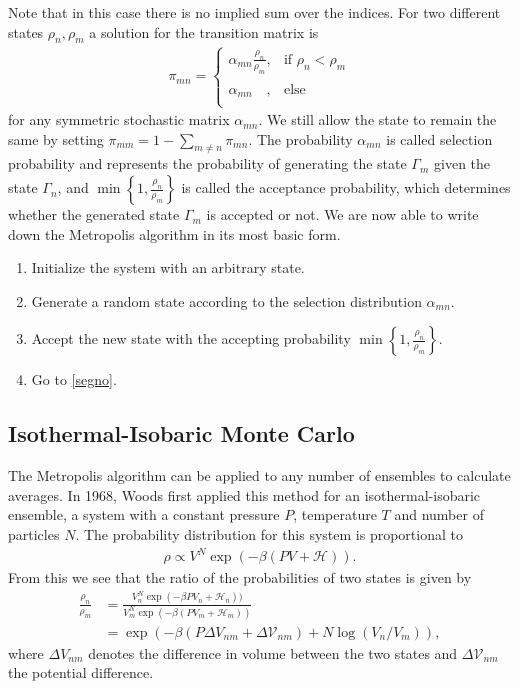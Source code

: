 Note that in this case there is no implied sum over the indices. For two different states $\rho_n,\rho_m$ a solution for the transition matrix is
\begin{align}
    \pi_{mn} =
    \begin{cases}
    \alpha_{mn} \frac{\rho_n}{\rho_m} , & \text{if } \rho_n<\rho_m\\
    \alpha_{mn} \phantom{\frac{\rho_n}{\rho_m}}, & \text{else}
     \end{cases}
\end{align}
for any symmetric stochastic matrix $\alpha_{mn}$. We still allow the state to remain the same by setting $\pi_{mm}=1-\sum_{m\neq n}\pi_{mn}$. The probability $\alpha_{mn}$ is called selection probability and represents the probability of generating the state $\Gamma_m$ given the state $\Gamma_n$, and  $\min\left\{1,\frac{\rho_n}{\rho_m}\right\}$ is called the acceptance probability, which determines whether the generated state $\Gamma_m$ is accepted or not. 
We are now able to write down the Metropolis algorithm in its most basic form.
\begin{enumerate}
    \item Initialize the system with an arbitrary state.
    \item \label{segno} Generate a random state according to the selection distribution $\alpha_{mn}$.
    \item Accept the new state with the accepting probability $\min\left\{1,\frac{\rho_n}{\rho_m}\right\}$.
    \item Go to \ref{segno}.
\end{enumerate}



\subsection{Isothermal-Isobaric Monte Carlo}
\label{subsubsec:isothermalisobaricMC}
The Metropolis algorithm can be applied to any number of ensembles to calculate averages. In 1968, Woods \cite{wood1968monte} first applied this method for an isothermal-isobaric ensemble, a system with a constant pressure $P$, temperature $T$ and number of particles $N$. The probability distribution for this system is proportional to
\begin{align}
    \rho \propto  V^N \exp(- \beta (PV+ \mathcal{H})).
\end{align}
From this we see that the ratio of the probabilities of two states is given by
\begin{align}
    \frac{\rho_n}{\rho_m} &= \frac{V_{n}^N\exp(-\beta PV_n+\mathcal{H}_n))}{V_{m}^N\exp(-\beta(PV_m+\mathcal{H}_m))}\\
                          &= \exp(-\beta (P\Delta V_{nm} + \Delta\mathcal{V}_{nm})+N\log(V_n/V_m)),
\end{align}
where  $\Delta V_{nm}$ denotes the difference in volume between the two states and $\Delta\mathcal{V}_{nm}$ the potential difference.

